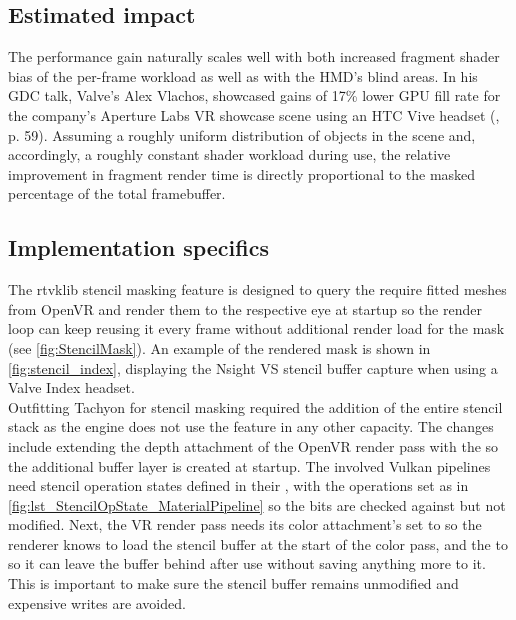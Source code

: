 \subsection{Estimated impact}
The performance gain naturally scales well with both increased fragment shader bias of the per-frame workload as well as with the HMD's blind areas. In his GDC talk, Valve's Alex Vlachos, showcased gains of 17\% lower GPU fill rate for the company's Aperture Labs \gls{VR} showcase scene using an HTC Vive headset (\cite{Vlachos.2015}, p. 59). 
Assuming a roughly uniform distribution of objects in the scene and, accordingly, a roughly constant shader workload during use, the relative improvement in fragment render time is directly proportional to the masked percentage of the total framebuffer. 

\subsection{Implementation specifics}
The \gls{rtvklib} stencil masking feature is designed to query the require fitted meshes from OpenVR and render them to the respective eye at startup so the render loop can keep reusing it every frame without additional render load for the mask (see \autoref{fig:StencilMask}). An example of the rendered mask is shown in \autoref{fig:stencil_index}, displaying the \gls{Nsight VS} stencil buffer capture when using a Valve Index headset. \\
Outfitting \gls{Tachyon} for stencil masking required the addition of the entire stencil stack as the engine does not use the feature in any other capacity. The changes include extending the depth attachment of the OpenVR render pass with the  so the additional buffer layer is created at startup. The involved Vulkan pipelines need stencil operation states defined in their , with the operations set as in \autoref{fig:lst_StencilOpState_MaterialPipeline} so the bits are checked against but not modified. Next, the \gls{VR} render pass needs its color attachment's  set to  so the renderer knows to load the stencil buffer at the start of the color pass, and the  to  so it can leave the buffer behind after use without saving anything more to it. This is important to make sure the stencil buffer remains unmodified and expensive writes are avoided. 

